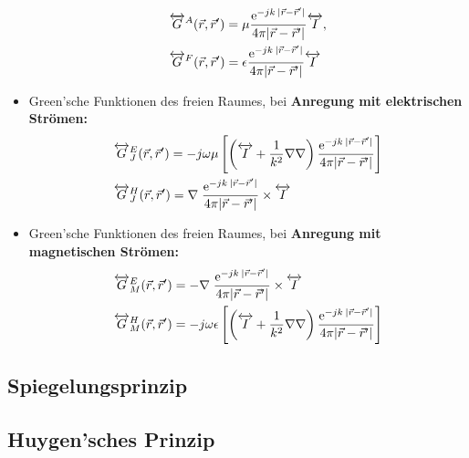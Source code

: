 \begin{itemize}
\begin{align*}
            &\overleftrightarrow{G}^A(\vec{r},\vec{r}^\prime) = \mu\dfrac{\mathrm{e}^{-jk\:|\vec{r} - \vec{r}^\prime|}}{4\pi|\vec{r} - \vec{r}^\prime|}\overleftrightarrow{I},\\
            &\overleftrightarrow{G}^F(\vec{r},\vec{r}^\prime) = \epsilon\dfrac{\mathrm{e}^{-jk\:|\vec{r} - \vec{r}^\prime|}}{4\pi|\vec{r} - \vec{r}^\prime|}\overleftrightarrow{I}
        \end{align*}
    \item Green'sche Funktionen des freien Raumes, bei \textbf{Anregung mit elektrischen Strömen:}\\
        \begin{align*}
            &\overleftrightarrow{G}^E_J(\vec{r},\vec{r}^\prime) = -j\omega\mu\left[\left(\overleftrightarrow{I} + \dfrac{1}{k^2}\nabla\nabla\right) \dfrac{\mathrm{e}^{-jk\:|\vec{r} - \vec{r}^\prime|}}{4\pi|\vec{r} - \vec{r}^\prime|}\right]\\
            &\overleftrightarrow{G}^H_J(\vec{r},\vec{r}^\prime) = \nabla\;\dfrac{\mathrm{e}^{-jk\:|\vec{r} - \vec{r}^\prime|}}{4\pi|\vec{r} - \vec{r}^\prime|} \times \overleftrightarrow{I}\\
        \end{align*}
    \item Green'sche Funktionen des freien Raumes, bei \textbf{Anregung mit magnetischen Strömen:}\\
        \begin{align*}
            &\overleftrightarrow{G}^E_M(\vec{r},\vec{r}^\prime) = -\nabla\;\dfrac{\mathrm{e}^{-jk\:|\vec{r} - \vec{r}^\prime|}}{4\pi|\vec{r} - \vec{r}^\prime|} \times \overleftrightarrow{I}\\
            &\overleftrightarrow{G}^H_M(\vec{r},\vec{r}^\prime) = -j\omega\epsilon\left[\left(\overleftrightarrow{I} + \dfrac{1}{k^2}\nabla\nabla\right) \dfrac{\mathrm{e}^{-jk\:|\vec{r} - \vec{r}^\prime|}}{4\pi|\vec{r} - \vec{r}^\prime|}\right]\\
        \end{align*}

\end{itemize}
\subsection{Spiegelungsprinzip}
\subsection{Huygen'sches Prinzip}
